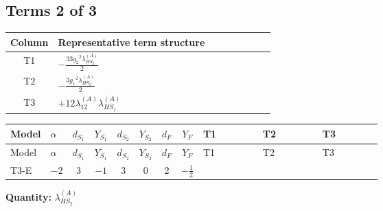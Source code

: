 \documentclass[8pt]{article}
\begin{document}
\begin{landscape}
\subsection*{Terms 2 of 3}
\begin{center}
\begin{tabular}{@{}c >{\raggedright\arraybackslash}p{0.82\linewidth}@{}}
\toprule
Column & Representative term structure \\
\midrule
T1 & \(\displaystyle -\frac{33 {g_2}^2 {\lambda_{HS_2}^{(A)}}}{2}\) \\
\midrule
T2 & \(\displaystyle -\frac{3 {g_1}^2 {\lambda_{HS_2}^{(A)}}}{2}\) \\
\midrule
T3 & \(\displaystyle +12 {\lambda_{12}^{(A)}} {\lambda_{HS_1}^{(A)}}\) \\
\midrule
\bottomrule
\end{tabular}
\end{center}
\smallskip
\tiny
\begin{longtable}{@{}llcccccc >{\raggedright\arraybackslash}p{0.21\linewidth} >{\raggedright\arraybackslash}p{0.21\linewidth} >{\raggedright\arraybackslash}p{0.21\linewidth}@{}}
\toprule
Model & $\alpha$ & $d_{S_1}$ & $Y_{S_1}$ & $d_{S_2}$ & $Y_{S_2}$ & $d_F$ & $Y_F$ & T1 & T2 & T3 \\
\midrule
\endfirsthead
\toprule
Model & $\alpha$ & $d_{S_1}$ & $Y_{S_1}$ & $d_{S_2}$ & $Y_{S_2}$ & $d_F$ & $Y_F$ & T1 & T2 & T3 \\
\midrule
\endhead
T3-E & $-2$ & $3$ & $-1$ & $3$ & $0$ & $2$ & $-\frac{1}{2}$ & \scriptsize\adjustbox{max width=\linewidth}{$\begin{gathered} -\frac{33 {g_2}^2 {\lambda_{HS_2}^{(A)}}}{2}\end{gathered}$} & \scriptsize\adjustbox{max width=\linewidth}{$\begin{gathered} -\frac{3 {g_1}^2 {\lambda_{HS_2}^{(A)}}}{2}\end{gathered}$} & \scriptsize\adjustbox{max width=\linewidth}{$\begin{gathered} +12 {\lambda_{12}^{(A)}} {\lambda_{HS_1}^{(A)}}\end{gathered}$} \\
\midrule
\bottomrule
\end{longtable}
\clearpage
\noindent\textbf{Quantity: }$\lambda_{HS_2}^{(A)}$\par\smallskip

\end{landscape}
\end{document}
